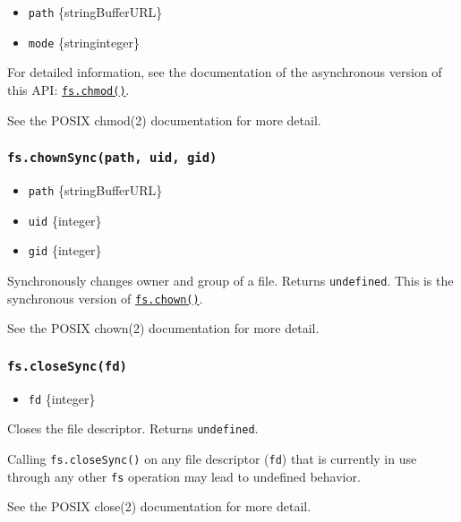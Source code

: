 \begin{itemize}
\tightlist
\item
  \texttt{path} \{string\textbar Buffer\textbar URL\}
\item
  \texttt{mode} \{string\textbar integer\}
\end{itemize}

For detailed information, see the documentation of the asynchronous
version of this API:
\hyperref[fschmodpath-mode-callback]{\texttt{fs.chmod()}}.

See the POSIX chmod(2) documentation for more detail.

\subsubsection{\texorpdfstring{\texttt{fs.chownSync(path,\ uid,\ gid)}}{fs.chownSync(path, uid, gid)}}\label{fs.chownsyncpath-uid-gid}

\begin{itemize}
\tightlist
\item
  \texttt{path} \{string\textbar Buffer\textbar URL\}
\item
  \texttt{uid} \{integer\}
\item
  \texttt{gid} \{integer\}
\end{itemize}

Synchronously changes owner and group of a file. Returns
\texttt{undefined}. This is the synchronous version of
\hyperref[fschownpath-uid-gid-callback]{\texttt{fs.chown()}}.

See the POSIX chown(2) documentation for more detail.

\subsubsection{\texorpdfstring{\texttt{fs.closeSync(fd)}}{fs.closeSync(fd)}}\label{fs.closesyncfd}

\begin{itemize}
\tightlist
\item
  \texttt{fd} \{integer\}
\end{itemize}

Closes the file descriptor. Returns \texttt{undefined}.

Calling \texttt{fs.closeSync()} on any file descriptor (\texttt{fd})
that is currently in use through any other \texttt{fs} operation may
lead to undefined behavior.

See the POSIX close(2) documentation for more detail.

